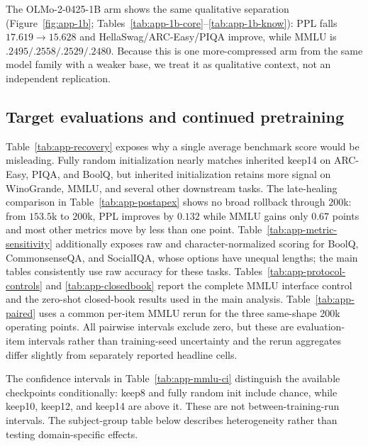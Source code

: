 The OLMo-2-0425-1B arm shows the same qualitative separation
(Figure~\ref{fig:app-1b}; Tables~\ref{tab:app-1b-core}--\ref{tab:app-1b-know}):
PPL falls $17.619\to15.628$ and HellaSwag/ARC-Easy/PIQA improve, while MMLU is
$.2495/.2558/.2529/.2480$. Because this is one more-compressed arm from the same
model family with a weaker base, we treat it as qualitative context, not an
independent replication.



\subsection{Target evaluations and continued pretraining}
\label{app:recovery}








Table~\ref{tab:app-recovery} exposes why a single average benchmark score would
be misleading. Fully random initialization nearly matches inherited keep14 on
ARC-Easy, PIQA, and BoolQ, but inherited initialization retains more signal on
WinoGrande, MMLU, and several other downstream tasks. The late-healing
comparison in Table~\ref{tab:app-postapex} shows no broad rollback through
$200$k: from $153.5$k to $200$k, PPL improves by $0.132$ while MMLU gains only
$0.67$ points and most other metrics move by less than one point.
Table~\ref{tab:app-metric-sensitivity} additionally exposes raw and
character-normalized scoring for BoolQ, CommonsenseQA, and SocialIQA,
whose options have unequal lengths; the main tables consistently use raw
accuracy for these tasks. Tables~\ref{tab:app-protocol-controls} and
\ref{tab:app-closedbook} report the complete MMLU interface control and the
zero-shot closed-book results used in the main analysis.
Table~\ref{tab:app-paired} uses a common per-item MMLU rerun for the three
same-shape 200k operating points. All pairwise intervals exclude zero, but these
are evaluation-item intervals rather than training-seed uncertainty and the
rerun aggregates differ slightly from separately reported headline cells.

The confidence intervals in Table~\ref{tab:app-mmlu-ci} distinguish the
available checkpoints conditionally: keep8 and fully random init include
chance, while keep10, keep12, and keep14 are above it. These are not
between-training-run intervals. The subject-group table below describes
heterogeneity rather than testing domain-specific effects.

